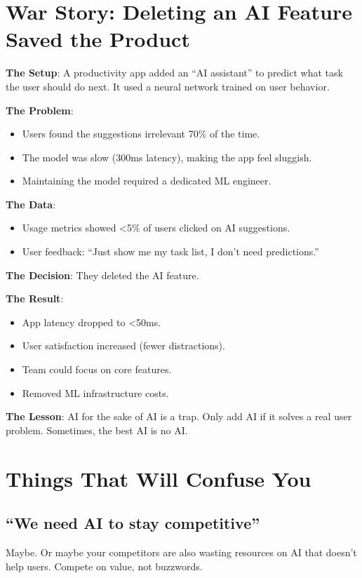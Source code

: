\section{War Story: Deleting an AI Feature Saved the Product}

\textbf{The Setup}: A productivity app added an ``AI assistant'' to predict what task the user should do next. It used a neural network trained on user behavior.

\textbf{The Problem}:
\begin{itemize}
\item Users found the suggestions irrelevant 70\% of the time.
\item The model was slow (300ms latency), making the app feel sluggish.
\item Maintaining the model required a dedicated ML engineer.
\end{itemize}

\textbf{The Data}:
\begin{itemize}
\item Usage metrics showed <5\% of users clicked on AI suggestions.
\item User feedback: ``Just show me my task list, I don't need predictions.''
\end{itemize}

\textbf{The Decision}: They deleted the AI feature.

\textbf{The Result}:
\begin{itemize}
\item App latency dropped to <50ms.
\item User satisfaction increased (fewer distractions).
\item Team could focus on core features.
\item Removed ML infrastructure costs.
\end{itemize}

\textbf{The Lesson}: AI for the sake of AI is a trap. Only add AI if it solves a real user problem. Sometimes, the best AI is no AI.

\section{Things That Will Confuse You}

\subsection{``We need AI to stay competitive''}
Maybe. Or maybe your competitors are also wasting resources on AI that doesn't help users. Compete on value, not buzzwords.

